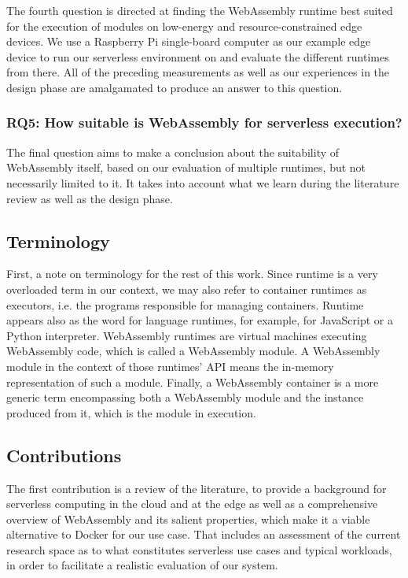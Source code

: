 The fourth question is directed at finding the WebAssembly runtime best suited for the execution of modules on low-energy and resource-constrained edge devices. We use a Raspberry Pi single-board computer as our example edge device to run our serverless environment on and evaluate the different runtimes from there. All of the preceding measurements as well as our experiences in the design phase are amalgamated to produce an answer to this question.

\subsubsection*{RQ5: How suitable is WebAssembly for serverless execution?}

The final question aims to make a conclusion about the suitability of WebAssembly itself, based on our evaluation of multiple runtimes, but not necessarily limited to it. It takes into account what we learn during the literature review as well as the design phase.

\subsection{Terminology}

First, a note on terminology for the rest of this work. Since runtime is a very overloaded term in our context, we may also refer to container runtimes as executors, i.e. the programs responsible for managing containers. Runtime appears also as the word for language runtimes, for example,  for JavaScript or a Python interpreter.
WebAssembly runtimes are virtual machines executing WebAssembly code, which is called a WebAssembly module. A WebAssembly module in the context of those runtimes' API means the in-memory representation of such a module. Finally, a WebAssembly container is a more generic term encompassing both a WebAssembly module and the instance produced from it, which is the module in execution.

\subsection{Contributions}

The first contribution is a review of the literature, to provide a background for serverless computing in the cloud and at the edge as well as a comprehensive overview of WebAssembly and its salient properties, which make it a viable alternative to Docker for our use case. That includes an assessment of the current research space as to what constitutes serverless use cases and typical workloads, in order to facilitate a realistic evaluation of our system.

